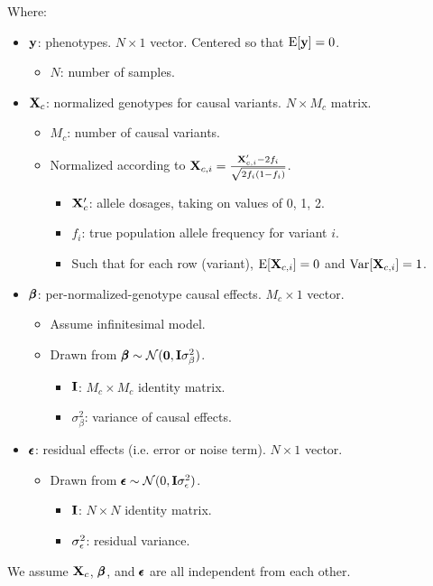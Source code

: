 \documentclass[12pt]{article}
\begin{document}
Where:
\begin{itemize}
    \item $\mathbf{y}$: phenotypes.
    $N \times 1$ vector.
    Centered so that $\mathrm{E}[\mathbf{y}]=0$.
    \begin{itemize}
        \item $N$: number of samples.
    \end{itemize}
    \item $\mathbf{X}_c$: normalized genotypes for causal variants.
    $N \times M_c$ matrix.
    \begin{itemize}
        \item $M_c$: number of causal variants.
        \item Normalized according to
        $\mathbf{X}_{c,i} = \frac{\mathbf{X}'_{c,i} - 2 f_i}{\sqrt{2 f_i (1 - f_i)}}$.
        \begin{itemize}
            \item $\mathbf{X}_c'$: allele dosages, taking on values of 0, 1, 2.
            \item $f_i$: true population allele frequency for variant $i$.
            \item Such that for each row (variant), $\mathrm{E}[\mathbf{X}_{c,i}] = 0$ and $\mathrm{Var}[\mathbf{X}_{c,i}] = 1$.
        \end{itemize}
    \end{itemize}
    \item $\pmb{\beta}$: per-normalized-genotype causal effects.
    $M_c \times 1$ vector.
    \begin{itemize}
        \item Assume infinitesimal model.
        \item Drawn from $\pmb{\beta} \sim \mathcal{N}(\mathbf{0}, \mathbf{I} \sigma_{\beta}^2)$.
        \begin{itemize}
            \item $\mathbf{I}$: $M_c \times M_c$ identity matrix.
            \item $\sigma_{\beta}^2$: variance of causal effects.
        \end{itemize}
    \end{itemize}
    \item $\pmb{\epsilon}$: residual effects (i.e. error or noise term). $N \times 1$ vector.
    \begin{itemize}
        \item Drawn from $\pmb{\epsilon} \sim \mathcal{N}(0, \mathbf{I} \sigma_{\epsilon}^2)$.
        \begin{itemize}
            \item $\mathbf{I}$: $N \times N$ identity matrix.
            \item $\sigma_{\epsilon}^2$: residual variance.
        \end{itemize}
    \end{itemize}
\end{itemize}
We assume $\mathbf{X}_c$, $\pmb{\beta}$, and $\pmb{\epsilon}$ are all independent from each other.
\end{document}
